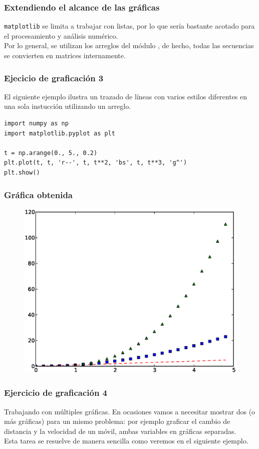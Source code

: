 \documentclass[12pt]{beamer}
\begin{document}
\begin{frame}
\frametitle{Extendiendo el alcance de las gráficas}
\texttt{matplotlib} se limita a trabajar con listas, por lo que sería bastante acotado para el procesamiento y análisis numérico.
\\
\medskip
\pause
Por lo general, se utilizan los arreglos del módulo , \pause de hecho, todas las secuencias se convierten en matrices internamente.
\end{frame}
\begin{frame}[fragile]
\frametitle{Ejecicio de graficación 3}
El siguiente ejemplo ilustra un trazado de líneas con varios estilos diferentes en una sola instucción utilizando un arreglo.
\pause
\begin{lstlisting}[caption=Gráfica más elaborada con un arreglo]
import numpy as np
import matplotlib.pyplot as plt

t = np.arange(0., 5., 0.2)
plt.plot(t, t, 'r--', t, t**2, 'bs', t, t**3, 'g^')
plt.show()
\end{lstlisting}
\end{frame}
\begin{frame}[fragile]
\frametitle{Gráfica obtenida}
\begin{figure}
	\centering
	\includegraphics[scale=0.475]{Imagenes/plotEjercicio3.eps}
\end{figure}
\end{frame}
\begin{frame}[fragile]
\frametitle{Ejercicio de graficación 4}
Trabajando con múltiples gráficas. \pause En ocasiones vamos a necesitar mostrar dos (o más gráficas) para un mismo problema: por ejemplo graficar el cambio de distancia y la velocidad de un móvil, ambas variables en gráficas separadas.
\\
\bigskip
\pause
Esta tarea se resuelve de manera sencilla como veremos en el siguiente ejemplo.
\end{frame}
\end{document}
